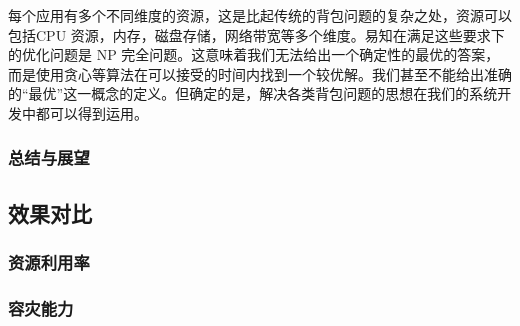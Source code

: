 每个应用有多个不同维度的资源，这是比起传统的背包问题的复杂之处，资源可以包括CPU 资源，内存，磁盘存储，网络带宽等多个维度。易知在满足这些要求下的优化问题是 NP 完全问题。这意味着我们无法给出一个确定性的最优的答案，而是使用贪心等算法在可以接受的时间内找到一个较优解。我们甚至不能给出准确的“最优”这一概念的定义。但确定的是，解决各类背包问题的思想在我们的系统开发中都可以得到运用。

\subsubsection{总结与展望}

\subsection{效果对比}

\subsubsection{资源利用率}

\subsubsection{容灾能力}

